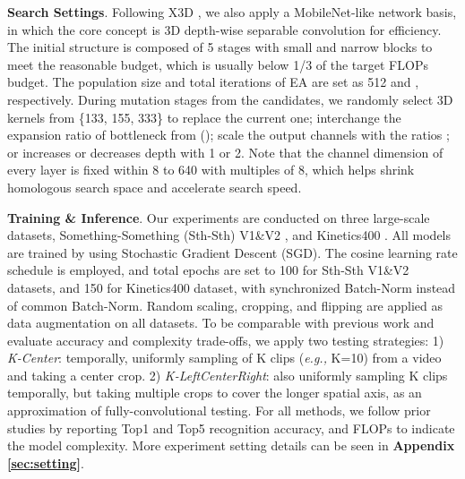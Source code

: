 \documentclass{article} \usepackage{iclr2023_conference,times}
\def\eg{\emph{e.g., }}
\begin{document}
\noindent\textbf{Search Settings}. 
Following X3D \citep{feichtenhofer2020x3d}, we also apply a MobileNet-like network basis, in which the core concept is 3D depth-wise separable convolution for efficiency.
The initial structure is composed of 5 stages with small and narrow blocks to meet the reasonable budget, which is usually below 1/3 of the target FLOPs budget.
The population size and total iterations of EA are set as 512 and , respectively.
During mutation stages from the candidates,
we randomly select 3D kernels from \{133, 155, 333\} to replace the current one; interchange the expansion ratio of bottleneck from (); scale the output channels with the ratios ; or increases or decreases depth with 1 or 2. 
Note that the channel dimension of every layer is fixed within 8 to 640 with multiples of 8, which helps shrink homologous search space and accelerate search speed.



\noindent\textbf{Training \& Inference}.
Our experiments are conducted on three large-scale datasets, Something-Something (Sth-Sth) V1\&V2 \citep{goyal2017something}, and Kinetics400 \citep{kay2017kinetics}.
All models are trained by using Stochastic Gradient Descent (SGD).
The cosine learning rate schedule \citep{loshchilov2016sgdr} is employed, and total epochs are set to 100 for Sth-Sth V1\&V2 datasets, and 150 for Kinetics400 dataset, with synchronized Batch-Norm instead of common Batch-Norm. 
Random scaling, cropping, and flipping are applied as data augmentation on all datasets.
To be comparable with previous work and evaluate accuracy and complexity trade-offs, we apply two testing strategies:
1) \textit{K-Center}: temporally, uniformly sampling of K clips (\eg K=10) from a video and taking a center crop.
2) \textit{K-LeftCenterRight}: also uniformly sampling K clips temporally, but taking multiple crops to cover the longer spatial axis, as an approximation of fully-convolutional testing.
For all methods, we follow prior studies by reporting Top1 and Top5 recognition accuracy, and FLOPs to indicate the model complexity.
More experiment setting details can be seen in \textbf{Appendix \ref{sec:setting}}.
\end{document}
